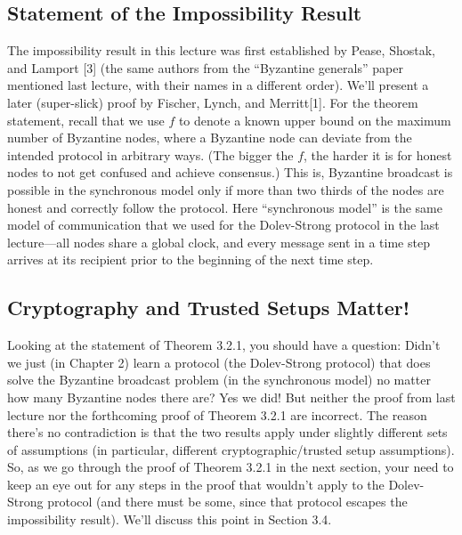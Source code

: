 \subsection{Statement of the Impossibility Result}
The impossibility result in this lecture was first established by Pease, Shostak, and Lamport [3] (the same authors from the “Byzantine generals” paper mentioned last lecture, with their names in a different order). We’ll present a later (super-slick) proof by Fischer, Lynch,
and Merritt[1]. For the theorem statement, recall that we use $f$ to denote a known upper
bound on the maximum number of Byzantine nodes, where a Byzantine node can deviate
from the intended protocol in arbitrary ways. (The bigger the $f$, the harder it is for honest
nodes to not get confused and achieve consensus.)
This is, Byzantine broadcast is possible in the synchronous model only if more than two thirds of the nodes are honest and correctly follow the protocol. Here “synchronous model” is the same model of communication that we used for the Dolev-Strong protocol in the last
lecture—all nodes share a global clock, and every message sent in a time step arrives at its
recipient prior to the beginning of the next time step.

\subsection{Cryptography and Trusted Setups Matter!}

Looking at the statement of Theorem 3.2.1, you should have a question: Didn't we just
(in Chapter 2) learn a protocol (the Dolev-Strong protocol) that does solve the Byzantine
broadcast problem (in the synchronous model) no matter how many Byzantine nodes there
are? Yes we did! But neither the proof from last lecture nor the forthcoming proof of
Theorem 3.2.1 are incorrect. The reason there’s no contradiction is that the two results apply
under slightly different sets of assumptions (in particular, different cryptographic/trusted
setup assumptions). So, as we go through the proof of Theorem 3.2.1 in the next section,
your need to keep an eye out for any steps in the proof that wouldn't apply to the
Dolev-Strong protocol (and there must be some, since that protocol escapes the impossibility
result). We’ll discuss this point in Section 3.4.


